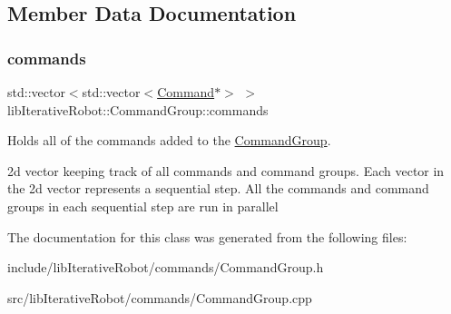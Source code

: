 \subsection{Member Data Documentation}
\mbox{\label{classlib_iterative_robot_1_1_command_group_aa7a293ed14071e183070e00580ccbecf}} 
\subsubsection{\texorpdfstring{commands}{commands}}
{\footnotesize\ttfamily std\+::vector$<$std\+::vector$<$\mbox{\hyperlink{classlib_iterative_robot_1_1_command}{Command}}$\ast$$>$ $>$ lib\+Iterative\+Robot\+::\+Command\+Group\+::commands\hspace{0.3cm}{\ttfamily [private]}}



Holds all of the commands added to the \mbox{\hyperlink{classlib_iterative_robot_1_1_command_group}{Command\+Group}}. 

2d vector keeping track of all commands and command groups. Each vector in the 2d vector represents a sequential step. All the commands and command groups in each sequential step are run in parallel 

The documentation for this class was generated from the following files\+:\begin{DoxyCompactItemize}
\item 
include/lib\+Iterative\+Robot/commands/Command\+Group.\+h\item 
src/lib\+Iterative\+Robot/commands/Command\+Group.\+cpp\end{DoxyCompactItemize}
